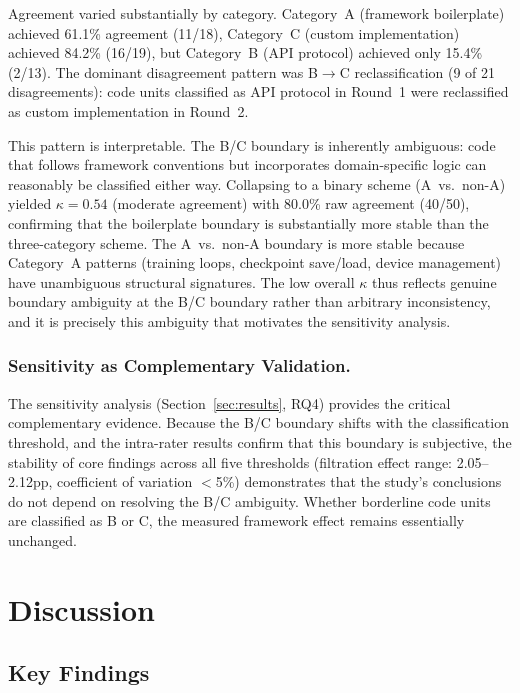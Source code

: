 \documentclass[smallextended,natbib]{svjour3}
\begin{document}
Agreement varied substantially by category. Category~A (framework boilerplate) achieved 61.1\% agreement (11/18), Category~C (custom implementation) achieved 84.2\% (16/19), but Category~B (API protocol) achieved only 15.4\% (2/13). The dominant disagreement pattern was B$\rightarrow$C reclassification (9 of 21 disagreements): code units classified as API protocol in Round~1 were reclassified as custom implementation in Round~2.

This pattern is interpretable. The B/C boundary is inherently ambiguous: code that follows framework conventions but incorporates domain-specific logic can reasonably be classified either way. Collapsing to a binary scheme (A~vs.\ non-A) yielded $\kappa = 0.54$ (moderate agreement) with 80.0\% raw agreement (40/50), confirming that the boilerplate boundary is substantially more stable than the three-category scheme. The A~vs.\ non-A boundary is more stable because Category~A patterns (training loops, checkpoint save/load, device management) have unambiguous structural signatures. The low overall $\kappa$ thus reflects genuine boundary ambiguity at the B/C boundary rather than arbitrary inconsistency, and it is precisely this ambiguity that motivates the sensitivity analysis.

\subsubsection{Sensitivity as Complementary Validation.}
The sensitivity analysis (Section~\ref{sec:results}, RQ4) provides the critical complementary evidence. Because the B/C boundary shifts with the classification threshold, and the intra-rater results confirm that this boundary is subjective, the stability of core findings across all five thresholds (filtration effect range: 2.05--2.12pp, coefficient of variation $<$5\%) demonstrates that the study's conclusions do not depend on resolving the B/C ambiguity. Whether borderline code units are classified as B or C, the measured framework effect remains essentially unchanged.


\section{Discussion}
\label{sec:discussion}

\subsection{Key Findings}
\end{document}
